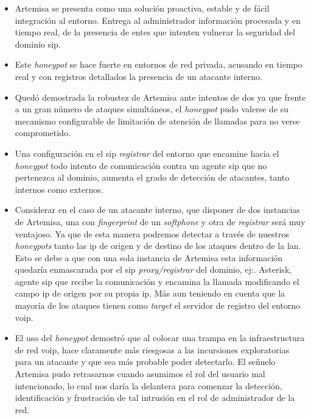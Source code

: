\documentclass[a4paper,12pt]{report}
\begin{document}
\begin{itemize}
\item{Artemisa se presenta como una solución proactiva, estable y de fácil
integración al entorno. Entrega al administrador información procesada y en
tiempo real, de la presencia de entes que intenten vulnerar la seguridad del
dominio \ac{sip}.}

\item{Este \emph{honeypot} se hace fuerte en entornos de red privada, acusando en
tiempo real y con registros detallados la presencia de un atacante interno.}

\item{Quedó demostrada la robustez de Artemisa ante intentos de \ac{dos} ya que
frente a un gran número de ataques simultáneos, el \emph{honeypot} pudo valerse de
su mecanismo configurable de limitación de atención de llamadas 
para no verse comprometido.}

\item{Una configuración en el \ac{sip} \emph{registrar} del entorno que encamine hacia
el \emph{honeypot} todo intento de comunicación contra un agente \ac{sip} que no 
pertenezca al dominio, aumenta el grado de detección de atacantes, tanto internos como
externos.}

\item{Considerar en el caso de un atacante interno, que disponer de dos instancias de Artemisa,
una con \emph{fingerprint} de un \emph{softphone} y otra de \emph{registrar} será muy ventajoso.
Ya que de esta manera podremos detectar a través de nuestros \emph{honeypots} tanto las \ac{ip} de
origen y de destino de los ataques dentro de la \ac{lan}. 
Esto se debe a que con una sola instancia de Artemisa esta información quedaría enmascarada por el \ac{sip} 
\emph{proxy/registrar} del dominio, ej:. Asterisk, agente \ac{sip} que recibe la comunicación y encamina
la llamada modificando el campo \ac{ip} de origen por su propia \ac{ip}. Más aun teniendo en cuenta
que la mayoría de los ataques tienen como \emph{target} el servidor de registro del entorno \ac{voip}.}

\item{El uso del \emph{honeypot} demostró que al colocar una trampa en la
infraestructura de red \ac{voip}, hace claramente más riesgosas a las incursiones exploratorias
para un atacante y que sea más probable poder detectarlo. El señuelo Artemisa
pudo retrasarnos cuando asumimos el rol del usuario mal intencionado, lo cual nos daría la delantera
para comenzar la detección, identificación y frustración de tal intrusión en el rol de administrador
de la red.}
\end{itemize}
\end{document}
